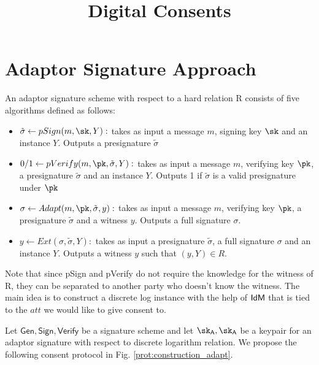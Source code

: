 \documentclass[11pt]{article}
\title{Digital Consents}
\begin{document}

\maketitle
\section{Adaptor Signature Approach}

An adaptor signature scheme with respect to a hard relation R consists of five algorithms defined as follows:

\begin{itemize}
    \item $\tilde{\sigma}\gets pSign(m, \sk, Y):$ takes as input a message $m$, signing key $\sk$ and an instance $Y$. Outputs a presignature $\tilde{\sigma}$
    \item $0/1 \gets pVerify(m, \pk, \tilde{\sigma}, Y):$ takes as input a message $m$, verifying key $\pk$, a presignature $\tilde{\sigma}$ and an instance $Y$. Outputs 1 if $\tilde{\sigma}$ is a valid presignature under $\pk$
    \item $\sigma \gets Adapt(m, \pk, \tilde{\sigma}, y):$ takes as input a message $m$, verifying key $\pk$, a presignature $\tilde{\sigma}$ and a witness $y$. Outputs a full signature $\sigma$.
    \item $y \gets Ext(\sigma, \tilde{\sigma}, Y):$ takes as input a presignature $\tilde{\sigma}$, a full signature $\sigma$ and an instance $Y$. Outputs a witness $y$ such that $(y, Y) \in R$.
\end{itemize}

Note that since pSign and pVerify do not require the knowledge for the witness of R, they can be separated to another party who doesn't know the witness. The main idea is to construct a discrete log instance with the help of $\textsf{IdM}$ that is tied to the $att$ we would like to give consent to.

Let $\mathsf{Gen,Sign, Verify}$ be a signature scheme  and let $\agentsk, \agentsk$ be a keypair for an adaptor signature with respect to discrete logarithm relation. We propose the following consent protocol in Fig. \ref{prot:construction_adapt}.
\end{document}
